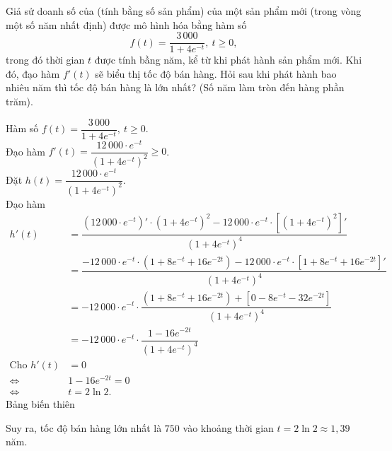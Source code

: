 \begin{bt}%

	Giả sử doanh số của (tính bằng số sản phẩm) của một sản phẩm mới (trong vòng một số năm nhất định) được mô hình hóa bằng hàm số 
	$$f(t) = \dfrac{3\,000}{1+4e^{-t}},\ t \ge 0,$$
	trong đó thời gian $t$ được tính bầng năm, kể từ khi phát hành sản phẩm mới. Khi đó, đạo hàm $f'(t)$ sẽ biểu thị tốc độ bán hàng. Hỏi sau khi phát hành bao nhiêu năm thì tốc độ bán hàng là lớn nhất? (Số năm làm tròn đến hàng phần trăm).
	
	\loigiai
	{
		Hàm số $f(t) = \dfrac{3\,000}{1+4e^{-t}},\ t \ge 0$.\\
		Đạo hàm $f'(t) = \dfrac{12\,000\cdot e^{-t}}{(1+4e^{-t})^{2}}\ge 0$.\\
		Đặt $h(t) = \dfrac{12\,000\cdot e^{-t}}{(1+4e^{-t})^{2}}$.\\
		Đạo hàm 
		\begin{align*}
			h'(t) &= \dfrac{\left(12\,000 \cdot e^{-t}\right)' \cdot (1+4e^{-t})^{2} - 12\,000 \cdot e^{-t} \cdot  \left[(1+4e^{-t})^{2}\right]'}{(1+4e^{-t})^{4}}\\
			&= \dfrac{-12\,000 \cdot e^{-t} \cdot (1 + 8e^{-t} + 16e^{-2t}) - 12\,000 \cdot e^{-t} \cdot  \left[1 + 8e^{-t} + 16e^{-2t}\right]'}{(1+4e^{-t})^{4}}\\
			&= -12\,000 \cdot e^{-t} \cdot \dfrac{(1 + 8e^{-t} + 16e^{-2t}) + \left[0 - 8e^{-t} - 32e^{-2t}\right]}{(1+4e^{-t})^{4}}\\
			&= -12\,000 \cdot e^{-t} \cdot \dfrac{1 - 16e^{-2t}}{(1+4e^{-t})^{4}}\\
			\text{Cho }h'(t) &=0\\
			\Leftrightarrow &1-16e^{-2t} = 0\\
			\Leftrightarrow &t=2\ln 2.
		\end{align*}
		Bảng biến thiên
		\begin{center}
		\end{center}
		Suy ra, tốc độ bán hàng lớn nhất là $750$ vào khoảng thời gian $t=2\ln 2 \approx 1{,}39$ năm.
	}
\end{bt}

